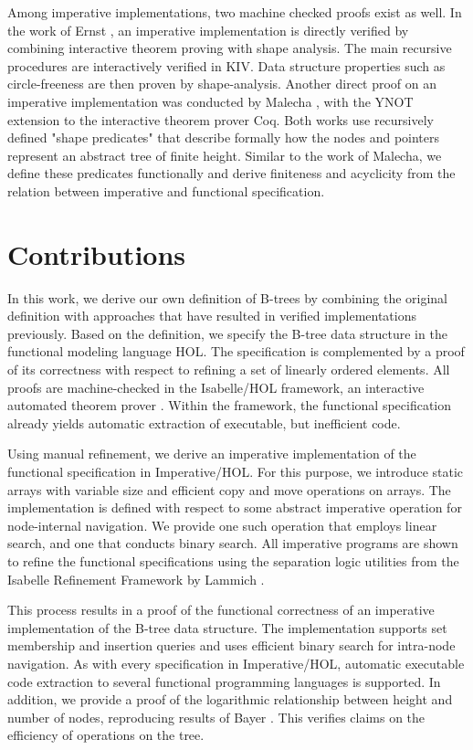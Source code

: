 \documentclass[a4paper,UKenglish,cleveref, autoref, thm-restate]{lipics-v2021}
\begin{document}
Among imperative implementations, two machine checked proofs exist as well.
In the work of Ernst \cite{DBLP:journals/sosym/ErnstSR15},
an imperative implementation is directly verified
by combining interactive theorem proving
with shape analysis.
The main recursive procedures are interactively verified in KIV.
Data structure properties such as circle-freeness are then proven by shape-analysis.
Another direct proof on an imperative implementation
was conducted by Malecha \cite{DBLP:conf/popl/MalechaMSW10}, with the YNOT
extension to the interactive theorem prover Coq.
Both works use recursively defined "shape predicates"
that describe formally how the nodes and pointers
represent an abstract tree of finite height.
Similar to the work of Malecha, we define these predicates functionally
and derive finiteness and acyclicity from the relation between imperative and functional specification.

\section{Contributions}

In this work, we derive our own definition of B-trees
by combining the original definition
with approaches that have resulted in verified implementations previously.
Based on the definition, we specify the B-tree data structure in the
functional modeling language HOL.
The specification is complemented by a proof of its correctness
with respect to refining a set of linearly ordered elements.
All proofs are machine-checked in the Isabelle/HOL framework,
an interactive automated theorem prover \cite{DBLP:books/sp/NipkowK14}.
Within the framework,
the functional specification already yields automatic extraction of executable,
but inefficient code.

Using manual refinement, we derive an imperative implementation of the functional specification
in Imperative/HOL.
For this purpose, we introduce static arrays with variable size
and efficient copy and move operations on arrays.
The implementation is defined with respect to some abstract imperative
operation for node-internal navigation.
We provide one such operation that employs linear search,
and one that conducts binary search.
All imperative programs are shown to refine the functional specifications
using the separation logic utilities from the Isabelle Refinement Framework by
Lammich \cite{DBLP:journals/jar/Lammich19}.

This process results in a proof of the functional correctness
of an imperative implementation of the B-tree data structure.
The implementation supports set membership and insertion queries
and uses efficient binary search for intra-node navigation.
As with every specification in Imperative/HOL,
automatic executable code extraction to
several functional programming languages is supported.
In addition, we provide a proof of the logarithmic relationship between height and number of nodes,
reproducing results of Bayer \cite{DBLP:journals/acta/BayerM72}.
This verifies claims on the efficiency of
operations on the tree.
\end{document}

